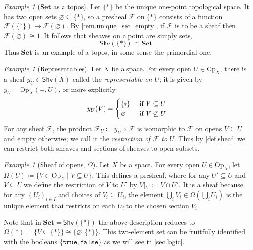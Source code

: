 \documentclass[11pt, oneside, article]{memoir}
\theoremstyle{plain}
\theoremstyle{definition}
\theoremstyle{remark}
\newtheorem{example}[theorem]{Example}
\renewcommand{\ss}{\subseteq}
\newcommand{\const}[1]{\mathtt{#1}}
\newcommand{\Set}[1]{\mathrm{#1}}
\newcommand{\Cat}[1]{\mathbf{#1}}
\newcommand{\fun}[1]{\mathcal{#1}}
\newcommand{\Fun}[1]{\mathsf{#1}}
\newcommand{\sheaf}[1]{\fun{#1}}
\newcommand{\smset}{\Cat{Set}}
\newcommand{\tn}[1]{\textnormal{#1}}
\newcommand{\shv}{\Fun{Shv}}
\newcommand{\Op}{\Set{Op}}
\newcommand{\rest}[2]{#1\big|\hspace{0in}_{#2}}
\newcommand{\true}{\const{true}}
\newcommand{\false}{\const{false}}
\begin{document}
\begin{example}[$\smset$ as a topos]\label{ex.set_topos}
Let $\{*\}$ be the unique one-point topological space. It has two open sets $\varnothing\ss\{*\}$, so a presheaf $\sheaf{F}$ on $\{*\}$ consists of a function $\sheaf{F}(\{*\})\to\sheaf{F}(\varnothing)$. By \cref{rem.unique_sec_empty}, if $\sheaf{F}$ is to be a sheaf then $\sheaf{F}(\varnothing)\cong 1$. It follows that sheaves on a point are simply sets,
\[
\shv(\{*\})\cong\smset.
\]
Thus $\smset$ is an example of a topos, in some sense the primordial one.
\end{example}

\begin{example}[Representables]\label{ex.representable_sheaf}
Let $X$ be a space. For every open $U\in\Op_X$, there is a sheaf $y_U\in\shv(X)$ called the \emph{representable on $U$}; it is given by $y_U=\Op_X(-,U)$, or more explicitly
\[
	y_U(V)=
	\begin{cases}
	\{*\}&\tn{ if }V\ss U\\
	\varnothing&\tn{ if }V\not\ss U
	\end{cases}
\]
For any sheaf $\sheaf{F}$, the product $\sheaf{F}_U\coloneqq y_U\times\sheaf{F}$ is isomorphic to $\sheaf{F}$ on opens $V\ss U$ and empty otherwise; we call it the \emph{restriction of $\sheaf{F}$ to $U$}. Thus by \cref{def.sheaf} we can restrict both sheaves and sections of sheaves to open subsets.
\end{example}

\begin{example}[Sheaf of opens, $\Omega$]\label{ex.subobject_classifier}
Let $X$ be a space. For every open $U\in\Op_X$, let $\Omega(U)\coloneqq\{V\in\Op_X\mid V\ss U\}$. This defines a presheaf, where for any $U'\ss U$ and $V\ss U$ we define the restriction of $V$ to $U'$ by $\rest{V}{U'}\coloneqq V\cap U'$. It is a sheaf because for any $(U_i)_{i\in I}$ and choices of $V_i\ss U_i$, the element $\bigcup_iV_i\in\Omega(\bigcup_i U_i)$ is the unique element that restricts on each $U_i$ to the chosen section $V_i$.

Note that in $\smset=\shv(\{*\})$ the above description reduces to $\Omega(*)=\{V\ss\{*\}\}\cong\{\varnothing,\{*\}\}$. This two-element set can be fruitfully identified with the booleans $\{\true,\false\}$ as we will see in \cref{sec.logic}.
\end{example}
\end{document}
